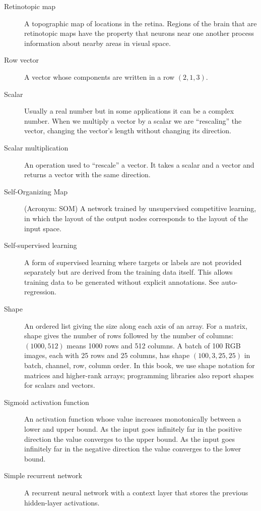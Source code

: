 \begin{description}
\item[Retinotopic map] A topographic map of locations in the retina. Regions of the brain that are retinotopic maps have the property that neurons near one another process information about nearby areas in visual space.

\item[Row vector] A vector whose components are written in a row \eg $(2,1,3)$.

\item[Scalar] Usually a real number but in some applications it can be a complex number.   When we multiply a vector by a scalar we are ``rescaling'' the vector, \ie changing the vector's length without changing its direction.

\item[Scalar multiplication] An operation used to ``rescale'' a vector. It takes a scalar and a vector and returns a vector with the same direction.

\item[Self-Organizing Map] (Acronym: SOM)  A network trained by unsupervised competitive learning, in which the layout of the output nodes corresponds to the layout of the input space.

\item[Self-supervised learning] A form of supervised learning where targets or labels are not provided separately but are derived from the training data itself. This allows training data to be generated without explicit annotations. See auto-regression.

\item[Shape] An ordered list giving the size along each axis of an array. For a matrix, shape gives the number of rows followed by the number of columns: $(1000,512)$ means 1000 rows and 512 columns. A batch of 100 RGB images, each with 25 rows and 25 columns, has shape $(100,3,25,25)$ in batch, channel, row, column order. In this book, we use shape notation for matrices and higher-rank arrays; programming libraries also report shapes for scalars and vectors.

\item[Sigmoid activation function] An activation function whose value increases monotonically between a lower and upper bound. As the input goes infinitely far in the positive direction the value converges to the upper bound. As the input goes infinitely far in the negative direction the value converges to the lower bound.

\item[Simple recurrent network] A recurrent neural network with a context layer that stores the previous hidden-layer activations.


\end{description}
